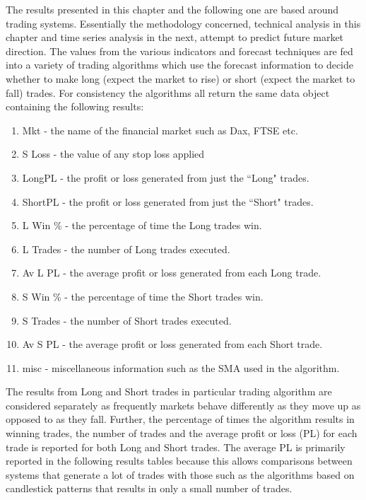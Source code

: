 The results presented in this chapter and the following one are based around trading systems. Essentially the methodology concerned, technical analysis in this chapter and time series analysis in the next, attempt to predict future market direction. The values from the various indicators and forecast techniques are fed into a variety of trading algorithms which use the forecast information to decide whether to make long (expect the market to rise) or short (expect the market to fall) trades. For consistency the algorithms all return the same data object containing the following results:

\begin{enumerate}
\item Mkt - the name of the financial market such as Dax, FTSE etc.
\item S Loss - the value of any stop loss applied
\item LongPL - the profit or loss generated from just the \textquotedblleft Long" trades.
\item ShortPL - the profit or loss generated from just the \textquotedblleft Short" trades.
\item L Win \% - the percentage of time the Long trades win.
\item L Trades - the number of Long trades executed.
\item Av L PL - the average profit or loss generated from each Long trade.
\item S Win \% - the percentage of time the Short trades win.
\item S Trades - the number of Short trades executed.
\item Av S PL - the average profit or loss generated from each Short trade.
\item misc - miscellaneous information such as the SMA used in the algorithm.
\end{enumerate}

The results from Long and Short trades in particular trading algorithm are considered separately as frequently markets behave differently as they move up as opposed to as they fall. Further, the percentage of times the algorithm results in winning trades, the number of trades and the average profit or loss (PL) for each trade is reported for both Long and Short trades. The average PL is primarily reported in the following results tables because this allows comparisons between systems that generate a lot of trades with those such as the algorithms based on candlestick patterns that results in only a small number of trades. 

